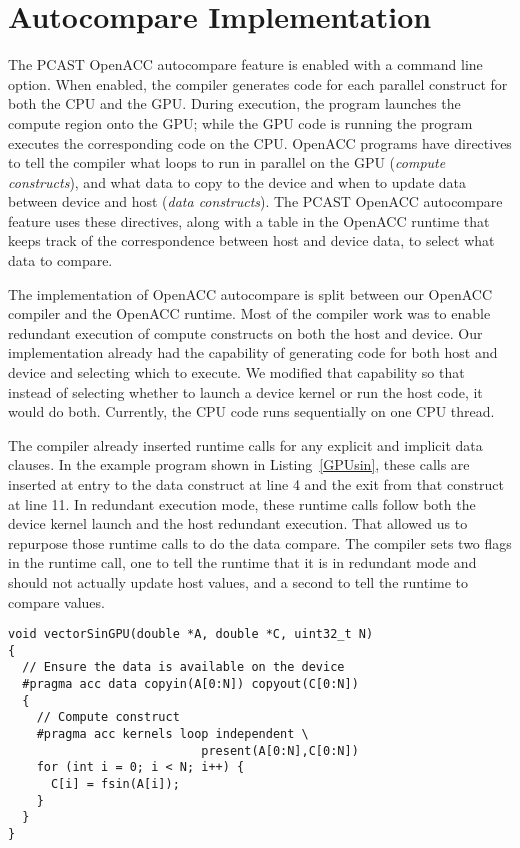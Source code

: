 \section{Autocompare Implementation}

The PCAST OpenACC autocompare feature is enabled with a command line option.
When enabled, the compiler generates code for each parallel construct for both the CPU and the GPU.
During execution, the program launches the compute region onto the GPU; while the GPU code is running the program executes the corresponding code on the CPU.
OpenACC programs have directives to tell the compiler what loops to run in parallel on the GPU (\emph{compute constructs}), and what data to copy to the device and when to update data between device and host (\emph{data constructs}).
The PCAST OpenACC autocompare feature uses these directives, along with a table in the OpenACC runtime that keeps track of the correspondence between host and device data, to select what data to compare.

The implementation of OpenACC autocompare is split between our OpenACC compiler and the OpenACC runtime.
Most of the compiler work was to enable redundant execution of compute constructs on both the host and device.
Our implementation already had the capability of generating code for both host and device and selecting which to execute.
We modified that capability so that instead of selecting whether to launch a device kernel or run the host code, it would do both.
Currently, the CPU code runs sequentially on one CPU thread.

The compiler already inserted runtime calls for any explicit and implicit data clauses.
In the example program shown in Listing~\ref{GPUsin}, these calls are inserted at entry to the data construct at line 4 and the exit from that construct at line 11.
In redundant execution mode, these runtime calls follow both the device kernel launch and the host redundant execution.
That allowed us to repurpose those runtime calls to do the data compare.
The compiler sets two flags in the runtime call, one to tell the runtime that it is in redundant mode and should not actually update host values, and a second to tell the runtime to compare values.
\begin{lstlisting}[caption={Sample OpenACC loop.}, label=GPUsin,frame=single,style=Cstyle]
void vectorSinGPU(double *A, double *C, uint32_t N)
{
  // Ensure the data is available on the device
  #pragma acc data copyin(A[0:N]) copyout(C[0:N])
  {
    // Compute construct
    #pragma acc kernels loop independent \
                           present(A[0:N],C[0:N])
    for (int i = 0; i < N; i++) {
      C[i] = fsin(A[i]);
    }
  }
}
\end{lstlisting}

